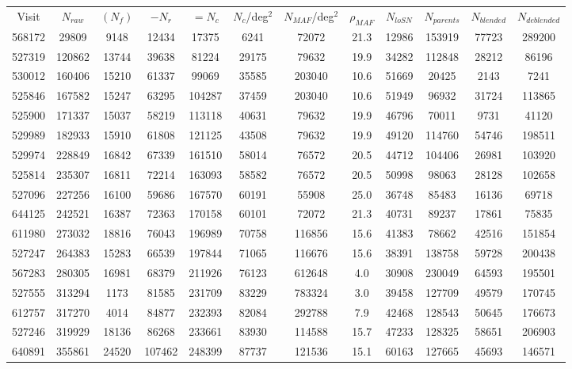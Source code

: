 \documentclass[DM,lsstdraft,toc,usenatbib]{lsstdoc}
\begin{document}
\begin{landscape}
\begin{longtable}{cccccccccccc}
Visit & $N_{raw}$ & $(N_{f})$ & $-N_{r}$ & $=N_{c}$ & $N_{c}$/deg$^{2}$ & $N_{MAF}$/deg$^{2}$ & $\rho_{MAF}$ & $N_{loSN}$ & $N_{parents}$ & $N_{blended}$ & $N_{deblended}$ \\
568172 & 29809 & 9148 & 12434 & 17375 & 6241 & 72072 & 21.3 & 12986 & 153919 & 77723 & 289200 \\
527319 & 120862 & 13744 & 39638 & 81224 & 29175 & 79632 & 19.9 & 34282 & 112848 & 28212 & 86196 \\
530012 & 160406 & 15210 & 61337 & 99069 & 35585 & 203040 & 10.6 & 51669 & 20425 & 2143 & 7241 \\
525846 & 167582 & 15247 & 63295 & 104287 & 37459 & 203040 & 10.6 & 51949 & 96932 & 31724 & 113865 \\
525900 & 171337 & 15037 & 58219 & 113118 & 40631 & 79632 & 19.9 & 46796 & 70011 & 9731 & 41120 \\
529989 & 182933 & 15910 & 61808 & 121125 & 43508 & 79632 & 19.9 & 49120 & 114760 & 54746 & 198511 \\
529974 & 228849 & 16842 & 67339 & 161510 & 58014 & 76572 & 20.5 & 44712 & 104406 & 26981 & 103920 \\
525814 & 235307 & 16811 & 72214 & 163093 & 58582 & 76572 & 20.5 & 50998 & 98063 & 28128 & 102658 \\
527096 & 227256 & 16100 & 59686 & 167570 & 60191 & 55908 & 25.0 & 36748 & 85483 & 16136 & 69718 \\
644125 & 242521 & 16387 & 72363 & 170158 & 60101 & 72072 & 21.3 & 40731 & 89237 & 17861 & 75835 \\
611980 & 273032 & 18816 & 76043 & 196989 & 70758 & 116856 & 15.6 & 41383 & 78662 & 42516 & 151854 \\
527247 & 264383 & 15283 & 66539 & 197844 & 71065 & 116676 & 15.6 & 38391 & 138758 & 59728 & 200438 \\
567283 & 280305 & 16981 & 68379 & 211926 & 76123 & 612648 & 4.0 & 30908 & 230049 & 64593 & 195501 \\
527555 & 313294 & 1173 & 81585 & 231709 & 83229 & 783324 & 3.0 & 39458 & 127709 & 49579 & 170745 \\
612757 & 317270 & 4014 & 84877 & 232393 & 82084 & 292788 & 7.9 & 42468 & 128543 & 50645 & 176673 \\
527246 & 319929 & 18136 & 86268 & 233661 & 83930 & 114588 & 15.7 & 47233 & 128325 & 58651 & 206903 \\
640891 & 355861 & 24520 & 107462 & 248399 & 87737 & 121536 & 15.1 & 60163 & 127665 & 45693 & 146571 \\

\end{longtable}
\end{landscape}
\end{document}

